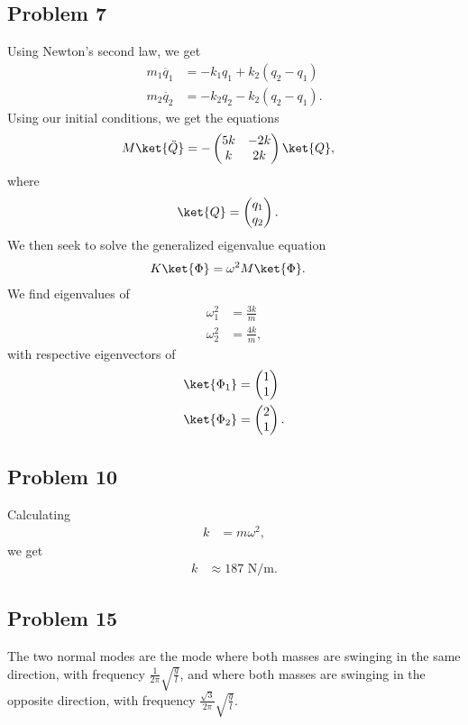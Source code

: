 \documentclass[10pt]{mypackage}
\begin{document}
\subsection{Problem 7}%
Using Newton's second law, we get
\begin{align*}
  m_1\ddot{q_1} &= -k_1q_1 + k_2\left(q_2 - q_1\right)\\
  m_2\ddot{q_2} &= -k_2q_2 - k_2\left(q_2 - q_1\right).
\end{align*}
Using our initial conditions, we get the equations
\begin{align*}
  M\ket{\ddot{Q}} &= -\begin{pmatrix}5k & -2k \\ k & 2k\end{pmatrix} \ket{Q},
\end{align*}
where
\begin{align*}
  \ket{Q} &= \begin{pmatrix}q_1\\q_2\end{pmatrix}.
\end{align*}
We then seek to solve the generalized eigenvalue equation
\begin{align*}
  K\ket{\Phi} &= \omega^2M\ket{\Phi}.
\end{align*}
We find eigenvalues of
\begin{align*}
  \omega_1^2 &= \frac{3k}{m}\\
  \omega_2^2 &= \frac{4k}{m},
\end{align*}
with respective eigenvectors of
\begin{align*}
  \ket{\Phi_1} &= \begin{pmatrix}1\\1\end{pmatrix}\\
  \ket{\Phi_2} &= \begin{pmatrix}2\\1\end{pmatrix}.
\end{align*}
\subsection{Problem 10}%
Calculating
\begin{align*}
  k &= m\omega^2,
\end{align*}
we get
\begin{align*}
  k &\approx 187\text{ N/m.}
\end{align*}
\subsection{Problem 15}%
The two normal modes are the mode where both masses are swinging in the same direction, with frequency $\frac{1}{2\pi}\sqrt{\frac{g}{l}}$, and where both masses are swinging in the opposite direction, with frequency $\frac{\sqrt{3}}{2\pi}\sqrt{\frac{g}{l}}$.
\end{document}
